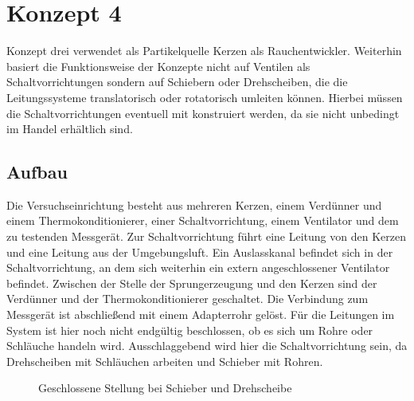 \section{Konzept 4}
Konzept drei verwendet als Partikelquelle Kerzen als Rauchentwickler. Weiterhin basiert die Funktionsweise der Konzepte nicht auf Ventilen als Schaltvorrichtungen sondern auf Schiebern oder Drehscheiben, die die Leitungssysteme translatorisch oder rotatorisch umleiten k\"{o}nnen. Hierbei m\"{u}ssen die Schaltvorrichtungen eventuell mit konstruiert werden, da sie nicht unbedingt im Handel erh\"{a}ltlich sind.

\subsection{Aufbau}
Die Versuchseinrichtung besteht aus mehreren Kerzen, einem Verd\"{u}nner und einem Thermokonditionierer, einer Schaltvorrichtung, einem Ventilator und dem zu testenden Messger\"{a}t. Zur Schaltvorrichtung f\"{u}hrt eine Leitung von den Kerzen und eine Leitung aus der Umgebungsluft. Ein Auslasskanal befindet sich in der Schaltvorrichtung, an dem sich weiterhin ein extern angeschlossener Ventilator befindet. Zwischen der Stelle der Sprungerzeugung und den Kerzen sind der Verd\"{u}nner und der Thermokonditionierer geschaltet. Die Verbindung zum Messger\"{a}t ist abschlie{\ss}end mit einem Adapterrohr gel\"{o}st. F\"{u}r die Leitungen im System ist hier noch nicht endg\"{u}ltig beschlossen, ob es sich um Rohre oder Schl\"{a}uche handeln wird. Ausschlaggebend wird hier die Schaltvorrichtung sein, da Drehscheiben mit Schl\"{a}uchen arbeiten und Schieber mit Rohren.
\begin{figure}[H]
        \myfloatalign
         \quad
        \caption[Geschlossene Stellung bei Schieber und Drehscheibe]
        {Geschlossene Stellung bei Schieber und Drehscheibe}
        \label{fig:concepts_4_off}
\end{figure}

